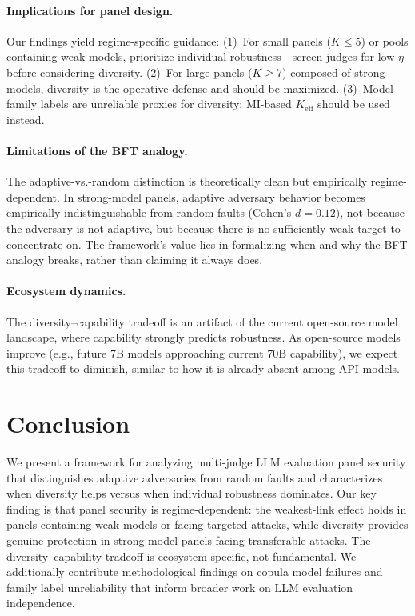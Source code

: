 \documentclass[11pt]{article}
\begin{document}
\paragraph{Implications for panel design.}
Our findings yield regime-specific guidance:
(1)~For small panels ($K \leq 5$) or pools containing weak models, prioritize individual robustness---screen judges for low $\eta$ before considering diversity.
(2)~For large panels ($K \geq 7$) composed of strong models, diversity is the operative defense and should be maximized.
(3)~Model family labels are unreliable proxies for diversity; MI-based $K_{\text{eff}}$ should be used instead.

\paragraph{Limitations of the BFT analogy.}
The adaptive-vs.-random distinction is theoretically clean but empirically regime-dependent.
In strong-model panels, adaptive adversary behavior becomes empirically indistinguishable from random faults (Cohen's $d = 0.12$), not because the adversary is not adaptive, but because there is no sufficiently weak target to concentrate on.
The framework's value lies in formalizing when and why the BFT analogy breaks, rather than claiming it always does.

\paragraph{Ecosystem dynamics.}
The diversity--capability tradeoff is an artifact of the current open-source model landscape, where capability strongly predicts robustness.
As open-source models improve (e.g., future 7B models approaching current 70B capability), we expect this tradeoff to diminish, similar to how it is already absent among API models.

\section{Conclusion}

We present a framework for analyzing multi-judge LLM evaluation panel security that distinguishes adaptive adversaries from random faults and characterizes when diversity helps versus when individual robustness dominates.
Our key finding is that panel security is regime-dependent: the weakest-link effect holds in panels containing weak models or facing targeted attacks, while diversity provides genuine protection in strong-model panels facing transferable attacks.
The diversity--capability tradeoff is ecosystem-specific, not fundamental.
We additionally contribute methodological findings on copula model failures and family label unreliability that inform broader work on LLM evaluation independence.
\end{document}
